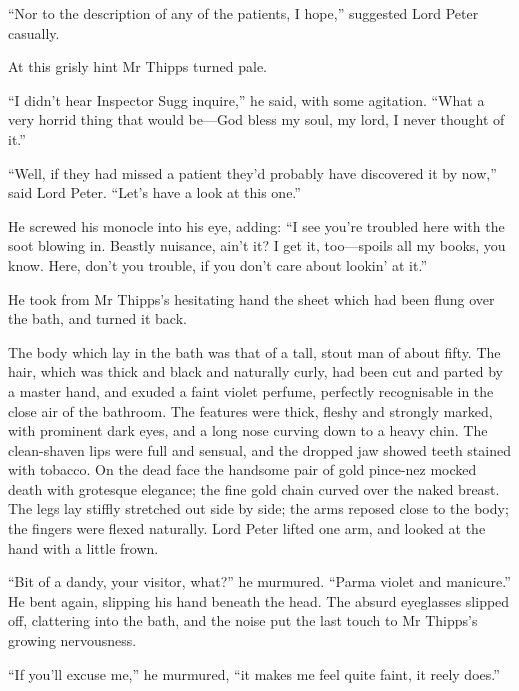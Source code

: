 \enquote{Nor to the description of any of the patients, I hope,} suggested Lord Peter casually.

At this grisly hint Mr Thipps turned pale.

\enquote{I didn’t hear Inspector Sugg inquire,} he said, with some agitation. \enquote{What a very horrid thing that would be\allowbreak---\allowbreak God bless my soul, my lord, I never thought of it.}

\enquote{Well, if they had missed a patient they’d probably have discovered it by now,} said Lord Peter. \enquote{Let’s have a look at this one.}

He screwed his monocle into his eye, adding: \enquote{I see you’re troubled here with the soot blowing in. Beastly nuisance, ain’t it? I get it, too\allowbreak---\allowbreak spoils all my books, you know. Here, don’t you trouble, if you don’t care about lookin’ at it.}

He took from Mr Thipps’s hesitating hand the sheet which had been flung over the bath, and turned it back.

The body which lay in the bath was that of a tall, stout man of about fifty. The hair, which was thick and black and naturally curly, had been cut and parted by a master hand, and exuded a faint violet perfume, perfectly recognisable in the close air of the bathroom. The features were thick, fleshy and strongly marked, with prominent dark eyes, and a long nose curving down to a heavy chin. The clean-shaven lips were full and sensual, and the dropped jaw showed teeth stained with tobacco. On the dead face the handsome pair of gold pince-nez mocked death with grotesque elegance; the fine gold chain curved over the naked breast. The legs lay stiffly stretched out side by side; the arms reposed close to the body; the fingers were flexed naturally. Lord Peter lifted one arm, and looked at the hand with a little frown.

\enquote{Bit of a dandy, your visitor, what?} he murmured. \enquote{Parma violet and manicure.} He bent again, slipping his hand beneath the head. The absurd eyeglasses slipped off, clattering into the bath, and the noise put the last touch to Mr Thipps’s growing nervousness.

\enquote{If you’ll excuse me,} he murmured, \enquote{it makes me feel quite faint, it reely does.}

